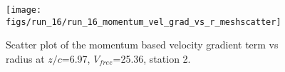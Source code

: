 \begin{figure}[H]
\centering
\texttt{[image: figs/run\_16/run\_16\_momentum\_vel\_grad\_vs\_r\_meshscatter]}
\caption{Scatter plot of the momentum based velocity gradient term vs radius at $z/c$=6.97, $V_{free}$=25.36, station 2.}
\label{fig:run_16_momentum_vel_grad_vs_r_meshscatter}
\end{figure}


